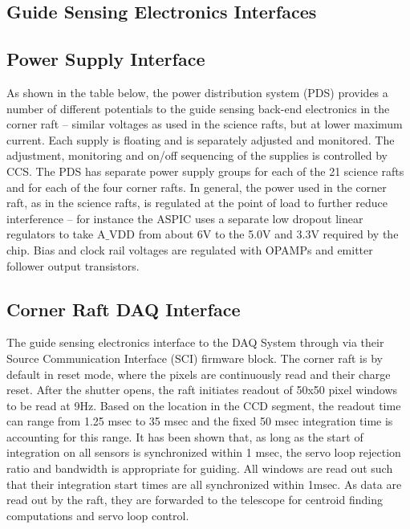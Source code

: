 \subsection{Guide Sensing Electronics Interfaces}

\subsection{Power Supply Interface}

As shown in the table below, the power distribution system (PDS) provides a number of different
potentials to the guide sensing back-end electronics in the corner raft – similar voltages as used in the
science rafts, but at lower maximum current. Each supply is floating and is separately adjusted and
monitored. The adjustment, monitoring and on/off sequencing of the supplies is controlled by CCS.
The PDS has separate power supply groups for each of the 21 science rafts and for each of the four
corner rafts. In general, the power used in the corner raft, as in the science rafts, is regulated at the
point of load to further reduce interference – for instance the ASPIC uses a separate low dropout linear
regulators to take A$\_$VDD from about 6V to the 5.0V and 3.3V required by the chip. Bias and clock rail
voltages are regulated with OPAMPs and emitter follower output transistors.


\subsection{Corner Raft DAQ Interface} 

The guide sensing electronics interface to the DAQ System through via their Source Communication
Interface (SCI) firmware block. The corner raft is by default in reset mode, where the pixels are
continuously read and their charge reset. After the shutter opens, the raft initiates readout of 50x50
pixel windows to be read at 9Hz. Based on the location in the CCD segment, the readout time can range
from 1.25 msec to 35 msec and the fixed 50 msec integration time is accounting for this range. It has
been shown that, as long as the start of integration on all sensors is synchronized within 1 msec, the
servo loop rejection ratio and bandwidth is appropriate for guiding. All windows are read out such that
their integration start times are all synchronized within 1msec. As data are read out by the raft, they are
forwarded to the telescope for centroid finding computations and servo loop control.

